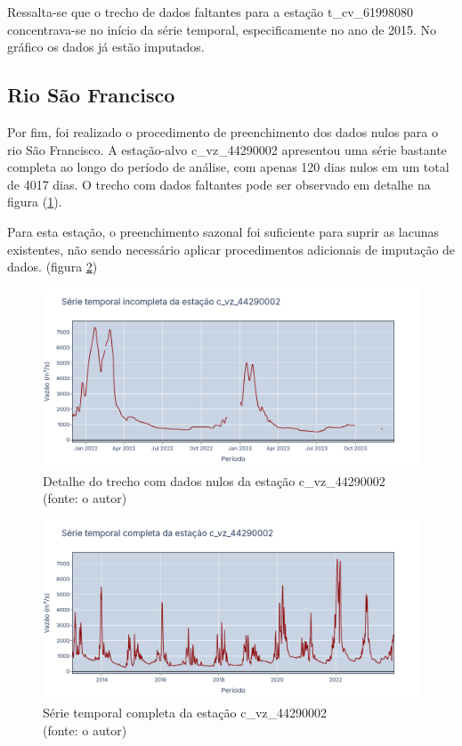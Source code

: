 Ressalta-se que o trecho de dados faltantes para a estação t\_cv\_61998080 concentrava-se no início da série temporal, especificamente no ano de 2015. No gráfico os dados já estão imputados.

\clearpage
\subsection{Rio São Francisco}

Por fim, foi realizado o procedimento de preenchimento dos dados nulos para o rio São Francisco. A estação-alvo c\_vz\_44290002 apresentou uma série bastante completa ao longo do período de análise, com apenas 120 dias nulos em um total de 4017 dias. O trecho com dados faltantes pode ser observado em detalhe na figura (\ref{fig:franciscoSerieIncompleta_c_vz_44290002-detalhe}).

Para esta estação, o preenchimento sazonal foi suficiente para suprir as lacunas existentes, não sendo necessário aplicar procedimentos adicionais de imputação de dados. (figura \ref{fig:franciscoSerieCompleta_c_vz_44290002})

\begin{figure}[!h]
	\centering
	\includegraphics[scale=0.25]{Figuras/rio_sao_francisco/franciscoSerieIncompleta_c_vz_44290002-detalhe.png}
	\caption{Detalhe do trecho com dados nulos da estação c\_vz\_44290002\\(fonte: o autor)}
	\label{fig:franciscoSerieIncompleta_c_vz_44290002-detalhe}
\end{figure}

\begin{figure}[!h]
	\centering
	\includegraphics[scale=0.25]{Figuras/rio_sao_francisco/franciscoSerieCompleta_c_vz_44290002.png}
	\caption{Série temporal completa da estação c\_vz\_44290002\\(fonte: o autor)}
	\label{fig:franciscoSerieCompleta_c_vz_44290002}
\end{figure}
\clearpage

